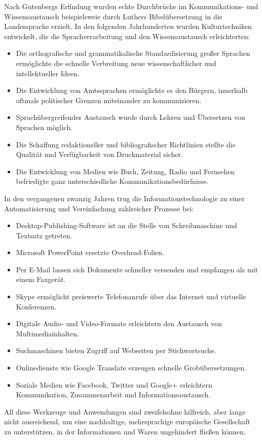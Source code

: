 \documentclass[]{../../metanetpaper}
\begin{document}
\begin{Parallel}[c]{79mm}{78mm}
{Nach Gutenbergs Erfindung wurden echte Durchbrüche im Kom\-mu\-ni\-ka\-tions- und Wis\-sens\-aus\-tausch beispielsweie durch Luthers Bibelübersetzung    in die Landessprache  erzielt. In den folgenden Jahrhunderten wurden Kulturtechniken entwickelt, die die Sprachverarbeitung und den Wissensaustausch erleichterten:
    \begin{itemize}
      \item Die orthografische und grammatikalische Standardisierung großer Sprachen ermöglichte die schnelle Verbreitung neue wissenschaftlicher und intellektueller Ideen.
      \item Die Entwicklung von Amtssprachen ermöglichte es den Bürgern, innerhalb oftmals politischer Grenzen miteinander zu kommunizieren.
      \item Sprachübergreifender Austausch wurde durch  Lehren und Übersetzen von Sprachen möglich.
      \item Die Schaffung redaktioneller und bibliografischer Richtlinien stellte die Qualität und Verfügbarkeit von Druckmaterial sicher.
      \item Die Entwicklung von Medien wie Buch, Zeitung, Radio und Fernsehen befriedigte ganz unterschiedliche Kommunikationsbedürfnisse.
    \end{itemize}
In den vergangenen zwanzig Jahren trug die Informationstechnologie zu einer Automatisierung und Vereinfachung zahlreicher Prozesse bei:
    \begin{itemize}
      \item Desktop-Publishing-Software ist an die Stelle von Schreibmaschine und Textsatz getreten.
      \item Microsoft PowerPoint ersetzte Overhead-Folien.
      \item Per E-Mail lassen sich Dokumente schneller versenden und empfangen als mit einem Faxgerät.
      \item Skype ermöglicht preiswerte Telefonanrufe über das Internet und virtuelle Konferenzen.
      \item Digitale Audio- und Video-Formate erleichtern den Austausch von Multimediainhalten.
      \item Suchmaschinen bieten Zugriff auf Webseiten per Stichwortsuche.
      \item Onlinedienste wie Google Translate erzeugen schnelle Grobübersetzungen.
      \item Soziale Medien  wie Facebook, Twitter und Google+ erleichtern  Kommunika\-tion, Zusammenarbeit und  Informationsaustausch.
    \end{itemize}
All diese Werkzeuge und Anwendungen sind zweifelsohne hilfreich, aber lange nicht ausreichend, um eine nachhaltige, mehrsprachige europäische Gesellschaft zu unterstützen, in der Informationen und Waren ungehindert fließen können.
  }


\end{Parallel}
\end{document}
